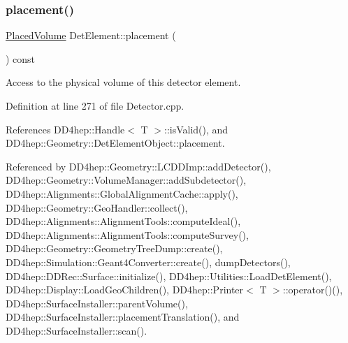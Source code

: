 \hypertarget{class_d_d4hep_1_1_geometry_1_1_det_element_a3afa8e83d1f71cfb13df316193218769}{}\label{class_d_d4hep_1_1_geometry_1_1_det_element_a3afa8e83d1f71cfb13df316193218769} 
\subsubsection{\texorpdfstring{placement()}{placement()}}
{\footnotesize\ttfamily \hyperlink{class_d_d4hep_1_1_geometry_1_1_placed_volume}{Placed\+Volume} Det\+Element\+::placement (\begin{DoxyParamCaption}{ }\end{DoxyParamCaption}) const}



Access to the physical volume of this detector element. 



Definition at line 271 of file Detector.\+cpp.



References D\+D4hep\+::\+Handle$<$ T $>$\+::is\+Valid(), and D\+D4hep\+::\+Geometry\+::\+Det\+Element\+Object\+::placement.



Referenced by D\+D4hep\+::\+Geometry\+::\+L\+C\+D\+D\+Imp\+::add\+Detector(), D\+D4hep\+::\+Geometry\+::\+Volume\+Manager\+::add\+Subdetector(), D\+D4hep\+::\+Alignments\+::\+Global\+Alignment\+Cache\+::apply(), D\+D4hep\+::\+Geometry\+::\+Geo\+Handler\+::collect(), D\+D4hep\+::\+Alignments\+::\+Alignment\+Tools\+::compute\+Ideal(), D\+D4hep\+::\+Alignments\+::\+Alignment\+Tools\+::compute\+Survey(), D\+D4hep\+::\+Geometry\+::\+Geometry\+Tree\+Dump\+::create(), D\+D4hep\+::\+Simulation\+::\+Geant4\+Converter\+::create(), dump\+Detectors(), D\+D4hep\+::\+D\+D\+Rec\+::\+Surface\+::initialize(), D\+D4hep\+::\+Utilities\+::\+Load\+Det\+Element(), D\+D4hep\+::\+Display\+::\+Load\+Geo\+Children(), D\+D4hep\+::\+Printer$<$ T $>$\+::operator()(), D\+D4hep\+::\+Surface\+Installer\+::parent\+Volume(), D\+D4hep\+::\+Surface\+Installer\+::placement\+Translation(), and D\+D4hep\+::\+Surface\+Installer\+::scan().

\hypertarget{class_d_d4hep_1_1_geometry_1_1_det_element_a45aa21f312dff00397e67813dda9222b}{}\label{class_d_d4hep_1_1_geometry_1_1_det_element_a45aa21f312dff00397e67813dda9222b} 

